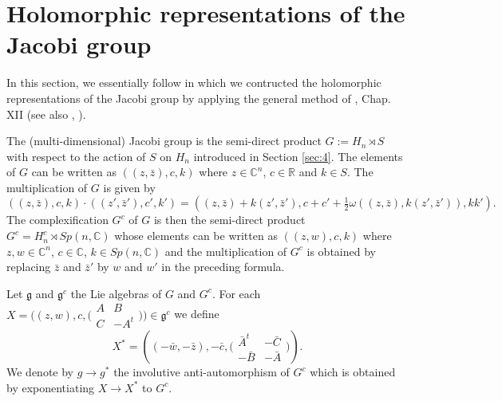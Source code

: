 \documentclass[12pt]{amsart}
\numberwithin{equation}{section}
\begin{document}
\section{Holomorphic representations of the Jacobi group} \label{sec:5}

In this section, we essentially follow \cite{CaPad2} in which we contructed the
holomorphic representations of the Jacobi group by applying the general method of 
\cite{Ne}, Chap. XII (see also \cite{Bern}, \cite{CaPad}).

The
(multi-dimensional) Jacobi group is the semi-direct product $G:=H_n\rtimes S$ with respect to the action of $S$ on $H_n$ introduced in Section \ref{sec:4}. The elements of $G$ can be written as $((z,{\bar
z}),c,k)$ where $z\in {\mathbb C}^n$, $c\in {\mathbb R}$ and $k\in
S$. The multiplication of $G$ is given by
\begin{equation*}((z,{\bar
z}),c,k)\cdot ((z',{\bar z'}),c',k')=((z,{\bar z})+k(z',{\bar
z'}),c+c'+\tfrac{1}{2}\omega ((z,{\bar z}),k(z',{\bar
z'})),kk').\end{equation*} The complexification $G^c$ of $G$ is then
the semi-direct product $G^c=H_n^c\rtimes Sp(n,{\mathbb C})$ whose elements can be written as $((z,w),c,k)$ where $z,w\in {\mathbb C}^n$, $c\in {\mathbb C}$, $k\in
Sp(n,{\mathbb C})$ and the
multiplication of $G^c$ is obtained by replacing ${\bar z}$ and
${\bar z'}$ by $w$ and $w'$ in the preceding formula. 

Let ${\mathfrak g}$ and ${\mathfrak
g}^c$ the Lie algebras of $G$ and $G^c$. For each
$X=\bigl((z,w),c,\bigl(\begin{smallmatrix} A&B\\
C&-A^t
\end{smallmatrix}\bigr)\bigr)\in {\mathfrak g}^c$ we define
\begin{equation*}X^{\ast}=((-{\bar w},-{\bar z}),-{\bar c},
\bigl(\begin{smallmatrix} {\bar A}^t&-{\bar C}\\
-{\bar B}&-{\bar A}
\end{smallmatrix}\bigr)).\end{equation*} 
We denote by $g\rightarrow g^{\ast}$ the
involutive anti-automorphism of $G^c$ which is obtained by
exponentiating $X\rightarrow X^{\ast}$ to $G^c$. 
\end{document}
